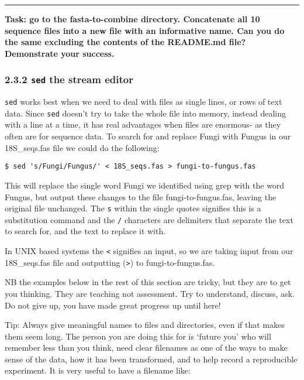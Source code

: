 \documentclass[11pt]{article}
\begin{document}
\begin{center}\rule{0.5\linewidth}{\linethickness}\end{center}

\textbf{Task: go to the fasta-to-combine directory. Concatenate all 10
sequence files into a new file with an informative name. Can you do the
same excluding the contents of the README.md file? Demonstrate your
success.}

    \hypertarget{sed-the-stream-editor}{%
\subsubsection{\texorpdfstring{2.3.2 \texttt{sed} the stream
editor}{2.3.2 sed the stream editor}}\label{sed-the-stream-editor}}

\texttt{sed} works best when we need to deal with files as single lines,
or rows of text data. Since \texttt{sed} doesn't try to take the whole
file into memory, instead dealing with a line at a time, it has real
advantages when files are enormous- as they often are for sequence data.
To search for and replace Fungi with Fungus in our 18S\_seqs.fas file we
could do the following:

\begin{verbatim}
$ sed 's/Fungi/Fungus/' < 18S_seqs.fas > fungi-to-fungus.fas
\end{verbatim}

This will replace the single word Fungi we identified using grep with
the word Fungus, but output these changes to the file
fungi-to-fungus.fas, leaving the original file unchanged. The \texttt{s}
within the single quotes signifies this is a substitution command and
the \texttt{/} characters are delimiters that separate the text to
search for, and the text to replace it with.

In UNIX based systems the \texttt{\textless{}} signifies an input, so we
are taking input from our 18S\_seqs.fas file and outputting
(\texttt{\textgreater{}}) to fungi-to-fungus.fas.

NB the examples below in the rest of this section are tricky, but they
are to get you thinking. They are teaching not assessment. Try to
understand, discuss, ask. Do not give up, you have made great progress
up until here!

Tip: Always give meaningful names to files and directories, even if that
makes them seem long. The person you are doing this for is `future you'
who will remember less than you think, need clear filenames as one of
the ways to make sense of the data, how it has been transformed, and to
help record a reproducible experiment. It is very useful to have a
filename like:
\end{document}
